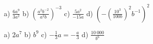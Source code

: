     \begin{tehtava}
        a) $\frac{6a^9}{3a^2}$ \qquad
        b) $(\frac{a^2b^{-2}}{a^2b})^{-3}$ \qquad
        c) $\frac{5a^2}{-15a}$ \qquad
        d) $\left(-(\frac{10^3}{100b})^2 b^{-1} \right )^2$
        
        \begin{vastaus}
            a) $2a^7$ \qquad
            b) $b^9$ \qquad
            c) $-\frac{1}{3}a = -\frac{a}{3}$ \qquad
            d) $\frac{10\ 000}{b^6}$
        \end{vastaus}
    \end{tehtava}

